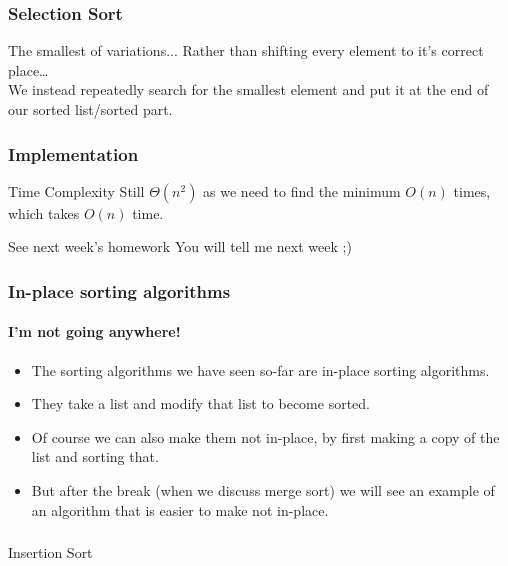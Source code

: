 \begin{frame}
	\frametitle{Selection Sort}
		\begin{block}{The smallest of variations...}
			Rather than shifting every element to it's correct place\dots\\
			\pause
			We instead repeatedly search for the smallest element and put it at the end of our sorted list/sorted part.
		\end{block}	
	\begin{center}
	
	\end{center}
\end{frame}

\begin{frame}
	\frametitle{Implementation}
	\begin{block}{Time Complexity}
		Still $\Theta(n^2)$ as we need to find the minimum $O(n)$ times, which takes $O(n)$ time.
		\end{block}	
	\begin{block}{See next week's homework}
		You will tell me next week ;)
	\end{block}	
\end{frame}

\begin{frame}
	\frametitle{In-place sorting algorithms}
	\framesubtitle{I'm not going anywhere!}

	\begin{itemize}
		\item The sorting algorithms we have seen so-far are \alert{in-place} sorting algorithms.
			\pause
		\item They take a list and modify that list to become sorted.
			\pause
		\item Of course we can also make them not in-place, by first making a copy of the list and sorting that.
			\pause
		\item But after the break (when we discuss merge sort) we will see an example of an algorithm that is easier to make
			not in-place.
	\end{itemize}
\end{frame}

\begin{frame}[fragile]\frametitle{}
\begin{center}
{\Large Insertion Sort}
\end{center}

\end{frame}

